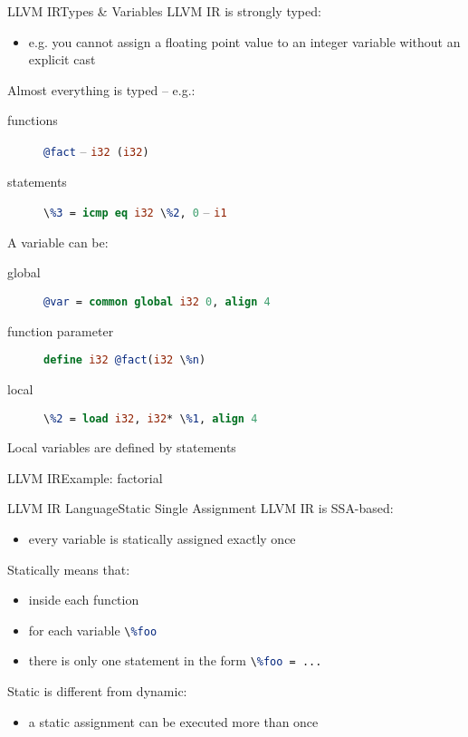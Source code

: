 \documentclass[10pt,mathserif]{beamer}
\newcommand{\llvminput}[1]{}
\newcommand{\llvminline}[1]{\lstinline[language=LLVM]!#1!}
\begin{document}
\begin{frame}{LLVM IR}{Types \& Variables}
LLVM IR is \alert{strongly typed}:

\begin{itemize}
\item e.g. you cannot assign a floating point value to an integer variable
without an explicit cast
\end{itemize}

\alert{Almost everything} is \alert{typed} -- e.g.:

\begin{description}
\item[functions] \llvminline{@fact} -- \llvminline{i32 (i32)}
\item[statements] \llvminline{\%3 = icmp eq i32 \%2, 0} -- \llvminline{i1}
\end{description}

A variable can be:

\begin{description}
\item[global] \llvminline{@var = common global i32 0, align 4}
\item[function parameter] \llvminline{define i32 @fact(i32 \%n)}
\item[local] \llvminline{\%2 = load i32, i32* \%1, align 4}
\end{description}

Local variables are defined by statements
\end{frame}

\begin{frame}{LLVM IR}{Example: factorial}

\begin{center}
\llvminput{snippet/01/fact.ll}
\end{center}
\end{frame}

\begin{frame}{LLVM IR Language}{Static Single Assignment}
LLVM IR is SSA-based:

\begin{itemize}
\item every variable is \alert{statically assigned} exactly \alert{once}
\end{itemize}

Statically means that:

\begin{itemize}
\item inside each function
\item for each variable \llvminline{\%foo}
\item there is only one statement in the form \llvminline{\%foo = ...}
\end{itemize}

Static is different from dynamic:

\begin{itemize}
\item a static assignment can be executed more than once
\end{itemize}
\end{frame}
\end{document}
